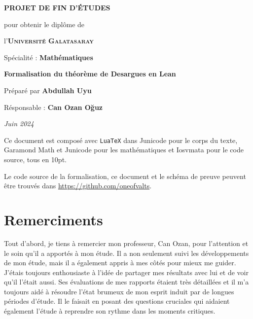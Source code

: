 \documentclass[fleqn, leqno, a4paper, openright, oneside, 10pt]{memoir}
\makeatletter
\newcommand\iraggedright{%
  \let\\\@centercr\@rightskip\@flushglue \rightskip\@rightskip
  \leftskip\z@skip}
\theoremstyle{definition}
\theoremstyle{remark}
\makeatother
\begin{document}
\frontmatter
\pagestyle{empty}
\begin{center}
  \vspace*{\fill}
  

  \vspace{1cm}
  \large{\textbf{PROJET DE FIN D'ÉTUDES}}

  \vspace{0.5cm}
  {\small pour obtenir le diplôme de}

  \vspace{0.5cm}
  l'\textsc{\textbf{Université Galatasaray}}

  {\small Spécialité : \textbf{Mathématiques}}

  \vspace{0.75cm}
  {\Large\textbf{Formalisation du théorème de Desargues en Lean}}

  \vspace{0.75cm}
  Préparé par \textbf{Abdullah Uyu}

  Résponsable : \textbf{Can Ozan Oğuz}

  \vspace*{\fill}
  \textit{Juin 2024}
  \vspace*{\fill}
\end{center}
\iraggedright
\raggedbottom
\clearpage
\null{}
\vfill{}
Ce document est composé avec \texttt{LuaTeX} dans Junicode pour le
corps du texte, Garamond Math et Junicode pour les mathématiques et Iosvmata
pour le code source, tous en 10pt.

Le code source de la formalisation, ce document et le schéma de preuve
peuvent être trouvés dans \url{https://github.com/oneofvalts}.
\chapter*{Remerciments}
Tout d'abord, je tiens à remercier mon professeur, Can Ozan, pour
l'attention et le soin qu'il a apportés à mon étude. Il a non seulement
suivi les développements de mon étude, mais il a également appris à mes
côtés pour mieux me guider. J'étais toujours enthousiaste à l'idée de
partager mes résultats avec lui et de voir qu'il l'était aussi. Ses
évaluations de mes rapports étaient très détaillées et il m'a toujours
aidé à résoudre l'état brumeux de mon esprit induit par de longues
périodes d'étude. Il le faisait en posant des questions cruciales qui
aidaient également l'étude à reprendre son rythme dans les moments
critiques.
\end{document}
